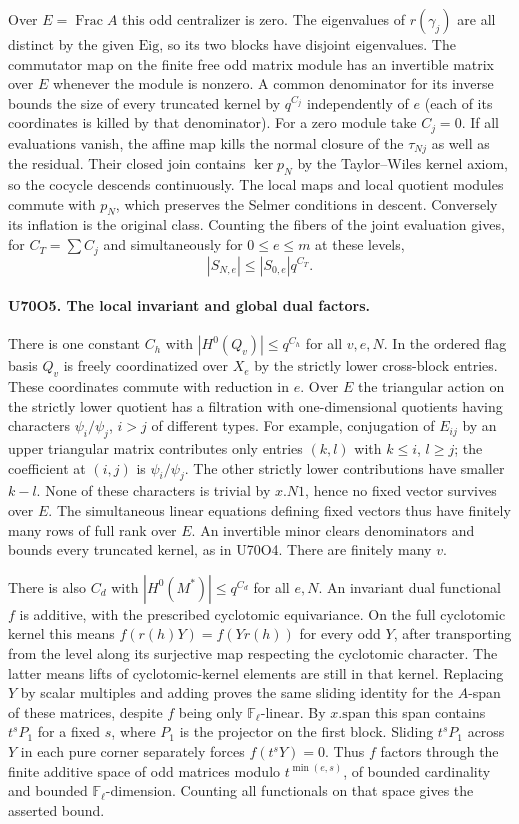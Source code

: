 Over $E=\operatorname{Frac} A$ this odd centralizer is zero.
The eigenvalues of $r(\gamma_j)$ are all distinct by the given
$\mathrm{Eig}$, so its two blocks have disjoint eigenvalues.
The commutator map on the finite free odd matrix module has
an invertible matrix over $E$ whenever the module is nonzero.
A common denominator for its inverse bounds the size of every
truncated kernel by $q^{C_j}$ independently of $e$ (each of its
coordinates is killed by that denominator). For a zero module
take $C_j=0$. If all evaluations vanish, the affine map kills
the normal closure of the $\tau_{Nj}$ as well as the residual.
Their closed join contains $\ker p_N$ by the Taylor--Wiles
kernel axiom, so the cocycle descends continuously. The local
maps and local quotient modules commute with $p_N$, which
preserves the Selmer conditions in descent. Conversely its
inflation is the original class. Counting the fibers of the
joint evaluation gives, for $C_T=\sum C_j$ and simultaneously
for $0\le e\le m$ at these levels,
\[
                  |S_{N,e}|\le |S_{0,e}| q^{C_T}.
\]

\paragraph{U70O5. The local invariant and global dual factors.}
There is one constant $C_h$ with $|H^0(Q_v)|\le q^{C_h}$
for all $v,e,N$. In the ordered flag basis $Q_v$ is freely
coordinatized over $X_e$ by the strictly lower cross-block
entries. These coordinates commute with reduction in $e$.
Over $E$ the triangular action on the strictly lower quotient
has a filtration with one-dimensional quotients having characters
$\psi_i/\psi_j$, $i>j$ of different types. For example,
conjugation of $E_{ij}$ by an upper triangular matrix contributes
only entries $(k,l)$ with $k\le i$, $l\ge j$; the coefficient
at $(i,j)$ is $\psi_i/\psi_j$. The other strictly lower
contributions have smaller $k-l$. None of these characters is
trivial by $x.N1$, hence no fixed vector survives over $E$.
The simultaneous linear equations defining fixed vectors thus
have finitely many rows of full rank over $E$. An invertible
minor clears denominators and bounds every truncated kernel,
as in U70O4. There are finitely many $v$.

There is also $C_d$ with $|H^0(M^*)|\le q^{C_d}$ for all $e,N$.
An invariant dual functional $f$ is additive, with the prescribed
cyclotomic equivariance. On the full cyclotomic kernel this means
$f(r(h)Y)=f(Yr(h))$ for every odd $Y$, after transporting from
the level along its surjective map respecting the cyclotomic
character. The latter means lifts of cyclotomic-kernel elements
are still in that kernel. Replacing $Y$ by scalar multiples and
adding proves the same sliding identity for the $A$-span of these
matrices, despite $f$ being only $\mathbb F_\ell$-linear. By
$x.\mathrm{span}$ this span contains $t^sP_1$ for a fixed $s$,
where $P_1$ is the projector on the first block. Sliding $t^sP_1$
across $Y$ in each pure corner separately forces $f(t^sY)=0$.
Thus $f$ factors through the finite additive space of odd matrices
modulo $t^{\min(e,s)}$, of bounded cardinality and bounded
$\mathbb F_\ell$-dimension. Counting all functionals on that
space gives the asserted bound.

